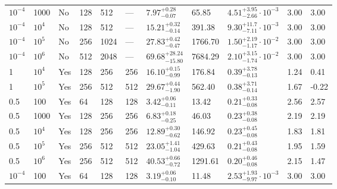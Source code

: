 \begin{table}
\begin{center}
\begin{tabular}{ p{1cm} p{1cm} p{1cm} p{1cm} p{1cm} p{1cm} p{1.75cm} p{1.5cm} p{2.75cm} p{1cm} p{1.2cm}  }
\vspace{0.08cm}$10^{-4}$	&	1000	&	No	&	128	&	512	&	---	&$	7.97	_{-	0.07	}^{+	0.28	}$&	65.85	&$	4.51	_{-	2.66	}^{+	3.95}\cdot 10^{-3}	$&	3.00	&	3.00	\\
\vspace{0.08cm}$10^{-4}$	&	$10^4$	&	No	&	128	&	512	&	---	&$	15.21	_{-	0.14	}^{+	0.32	}$&	391.38	&$	9.30	_{-	7.11	}^{+	11.7}\cdot 10^{-3}	$&	3.00	&	3.00	\\
\vspace{0.08cm}$10^{-4}$	&	$10^5$	&	No	&	256	&	1024	&	---	&$	27.83	_{-	0.47	}^{+	0.42	}$&	1766.70	&$	1.50	_{-	1.17	}^{+	2.19}\cdot 10^{-2}	$&	3.00	&	3.00	\\
\vspace{0.08cm}$10^{-4}$	&	$10^6$	&	No	&	512	&	2048	&	---	&$	69.68	_{-	15.80	}^{+	28.24	}$&	7684.29	&$	2.10	_{-	1.74	}^{+	3.15}\cdot 10^{-2}	$&	3.00	&	3.00	\\
\vspace{0.08cm}1	&	$10^4$	&	Yes	&	128	&	256	&	256	&$	16.10	_{-	0.99	}^{+	0.15	}$&	176.84	&$	0.39	_{-	0.13	}^{+	3.78	}$&	1.24	&	0.41	\\
\vspace{0.08cm}1	&	$10^5$	&	Yes	&	256	&	512	&	512	&$	29.67	_{-	1.90	}^{+	0.44	}$&	562.40	&$	0.38	_{-	0.14	}^{+	3.71	}$&	1.67	&	-0.22	\\
\vspace{0.08cm}0.5	&	100	&	Yes	&	64	&	128	&	128	&$	3.42	_{-	0.11	}^{+	0.06	}$&	13.42	&$	0.21	_{-	0.08	}^{+	0.33	}$&	2.56	&	2.57	\\
\vspace{0.08cm}0.5	&	1000	&	Yes	&	128	&	256	&	256	&$	6.83	_{-	0.25	}^{+	0.18	}$&	46.03	&$	0.23	_{-	0.08	}^{+	0.38	}$&	2.19	&	2.19	\\
\vspace{0.08cm}0.5	&	$10^4$	&	Yes	&	128	&	256	&	256	&$	12.89	_{-	0.62	}^{+	0.30	}$&	146.92	&$	0.23	_{-	0.08	}^{+	0.45	}$&	1.83	&	1.81	\\
\vspace{0.08cm}0.5	&	$10^5$	&	Yes	&	256	&	512	&	512	&$	23.05	_{-	1.04	}^{+	1.41	}$&	429.63	&$	0.21	_{-	0.08	}^{+	0.43	}$&	1.95	&	1.59	\\
\vspace{0.08cm}0.5	&	$10^6$	&	Yes	&	256	&	512	&	512	&$	40.53	_{-	0.72	}^{+	0.66	}$&	1291.61	&$	0.20	_{-	0.08	}^{+	0.46	}$&	2.15	&	1.47	\\
\vspace{0.08cm}$10^{-4}$	&	100	&	Yes	&	64	&	128	&	128	&$	3.19	_{-	0.10	}^{+	0.06	}$&	11.48	&$	2.53	_{-	9.97	}^{+	1.93}\cdot 10^{-3}	$&	3.00	&	3.00	\\

\end{tabular}
\end{center}
\end{table}
